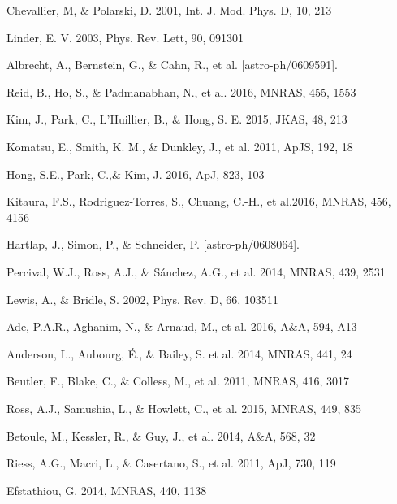 \documentclass[prl,twocolumn,superscriptaddress,aps,amsmath,amssymb,nofootinbib,altaffilletter]{revtex4}
\begin{document}
\begin{thebibliography}{}
Chevallier, M, \& Polarski, D. 2001, Int. J. Mod. Phys. D,  10, 213

Linder, E. V. 2003, Phys. Rev. Lett, 90, 091301


Albrecht, A., Bernstein, G., \& Cahn, R., et al. [astro-ph/0609591].

Reid, B., Ho, S., \& Padmanabhan, N., et al.  2016, MNRAS, 455, 1553

Kim, J., Park, C., L'Huillier, B., \& Hong, S. E. 2015, JKAS, 48, 213

Komatsu, E., Smith, K. M., \& Dunkley, J., et al. 2011, ApJS, 192, 18  


Hong, S.E., Park, C.,\&  Kim, J. 2016, ApJ, 823, 103

Kitaura, F.S., Rodriguez-Torres, S., Chuang, C.-H., et al.2016, MNRAS, 456, 4156

Hartlap, J., Simon, P., \& Schneider, P. [astro-ph/0608064].

Percival, W.J., Ross, A.J., \& S\'{a}nchez, A.G., et al. 2014, MNRAS, 439, 2531

Lewis, A., \& Bridle, S. 2002, Phys. Rev. D, 66, 103511

Ade, P.A.R., Aghanim, N., \& Arnaud, M., et al. 2016, A\&A, 594, A13 

Anderson, L., Aubourg, \'E., \& Bailey, S. et al. 2014, MNRAS, 441, 24 

Beutler, F., Blake, C., \& Colless, M., et al. 2011, MNRAS, 416, 3017

Ross, A.J., Samushia, L., \& Howlett, C., et al. 2015, MNRAS, 449, 835

Betoule, M., Kessler, R., \& Guy, J., et al. 2014, A\&A, 568, 32

Riess, A.G., Macri, L., \& Casertano, S., et al. 2011, ApJ, 730, 119

Efstathiou, G. 2014, MNRAS, 440, 1138










\end{thebibliography}
\end{document}
